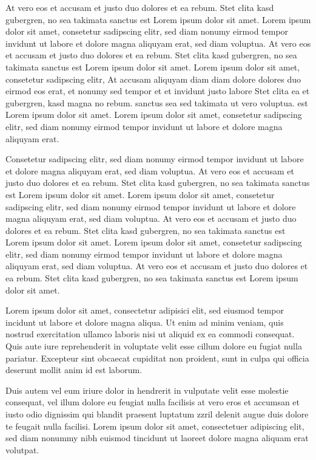\documentclass[a4paper]{article}
\begin{document}
At vero eos et accusam et justo duo dolores et ea rebum. Stet clita kasd
gubergren, no sea takimata sanctus est Lorem ipsum dolor sit amet. Lorem ipsum
dolor sit amet, consetetur sadipscing elitr, sed diam nonumy eirmod tempor
invidunt ut labore et dolore magna aliquyam erat, sed diam voluptua. At vero
eos et accusam et justo duo dolores et ea rebum. Stet clita kasd gubergren, no
sea takimata sanctus est Lorem ipsum dolor sit amet. Lorem ipsum dolor sit
amet, consetetur sadipscing elitr, At accusam aliquyam diam diam dolore dolores
duo eirmod eos erat, et nonumy sed tempor et et invidunt justo labore Stet
clita ea et gubergren, kasd magna no rebum. sanctus sea sed takimata ut vero
voluptua. est Lorem ipsum dolor sit amet. Lorem ipsum dolor sit amet,
consetetur sadipscing elitr, sed diam nonumy eirmod tempor invidunt ut labore
et dolore magna aliquyam erat.

Consetetur sadipscing elitr, sed diam nonumy eirmod tempor invidunt ut labore
et dolore magna aliquyam erat, sed diam voluptua. At vero eos et accusam et
justo duo dolores et ea rebum. Stet clita kasd gubergren, no sea takimata
sanctus est Lorem ipsum dolor sit amet. Lorem ipsum dolor sit amet, consetetur
sadipscing elitr, sed diam nonumy eirmod tempor invidunt ut labore et dolore
magna aliquyam erat, sed diam voluptua. At vero eos et accusam et justo duo
dolores et ea rebum. Stet clita kasd gubergren, no sea takimata sanctus est
Lorem ipsum dolor sit amet. Lorem ipsum dolor sit amet, consetetur sadipscing
elitr, sed diam nonumy eirmod tempor invidunt ut labore et dolore magna aliquyam
erat, sed diam voluptua. At vero eos et accusam et justo duo dolores et ea
rebum. Stet clita kasd gubergren, no sea takimata sanctus est Lorem ipsum dolor
sit amet.

Lorem ipsum dolor sit amet, consectetur adipisici elit, sed eiusmod tempor
incidunt ut labore et dolore magna aliqua. Ut enim ad minim veniam, quis
nostrud exercitation ullamco laboris nisi ut aliquid ex ea commodi consequat.
Quis aute iure reprehenderit in voluptate velit esse cillum dolore eu fugiat
nulla pariatur. Excepteur sint obcaecat cupiditat non proident, sunt in culpa
qui officia deserunt mollit anim id est laborum.


Duis autem vel eum iriure dolor in hendrerit in vulputate velit esse molestie
consequat, vel illum dolore eu feugiat nulla facilisis at vero eros et accumsan
et iusto odio dignissim qui blandit praesent luptatum zzril delenit augue duis
dolore te feugait nulla facilisi. Lorem ipsum dolor sit amet, consectetuer
adipiscing elit, sed diam nonummy nibh euismod tincidunt ut laoreet dolore
magna aliquam erat volutpat.
\end{document}
